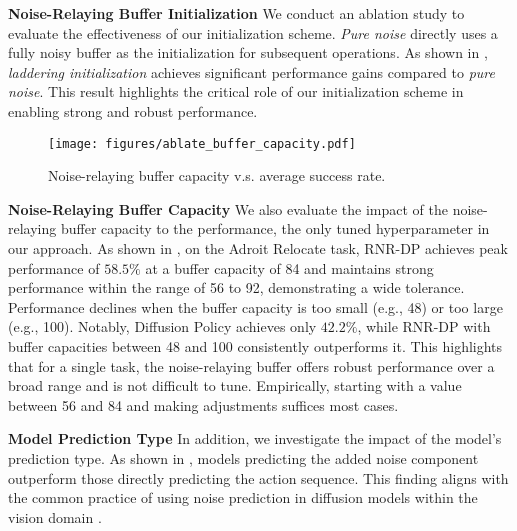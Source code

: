 


\textbf{Noise-Relaying Buffer Initialization}
We conduct an ablation study to evaluate the effectiveness of our initialization scheme. \emph{Pure noise} directly uses a fully noisy buffer as the initialization for subsequent operations. As shown in , \emph{laddering initialization} achieves significant performance gains compared to \emph{pure noise}. This result highlights the critical role of our initialization scheme in enabling strong and robust performance.



\begin{wrapfigure}{r}{0.34\textwidth}
    \centering
    \vspace{-\baselineskip}
    \texttt{[image: figures/ablate\_buffer\_capacity.pdf]}
    \vspace{-13pt}
    \caption{Noise-relaying buffer capacity v.s. average success rate.}
    \label{fig:ablate_buffer_capacity}
\end{wrapfigure}
\textbf{Noise-Relaying Buffer Capacity}
We also evaluate the impact of the noise-relaying buffer capacity to the performance, the only tuned hyperparameter in our approach. As shown in , on the Adroit Relocate task, RNR-DP achieves peak performance of \(58.5\%\) at a buffer capacity of 84 and maintains strong performance within the range of 56 to 92, demonstrating a wide tolerance. Performance declines when the buffer capacity is too small (e.g., 48) or too large (e.g., 100). Notably, Diffusion Policy achieves only \(42.2\%\), while RNR-DP with buffer capacities between 48 and 100 consistently outperforms it. This highlights that for a single task, the noise-relaying buffer offers robust performance over a broad range and is not difficult to tune. Empirically, starting with a value between 56 and 84 and making adjustments suffices most cases.


\vspace{1em}
\textbf{Model Prediction Type}
In addition, we investigate the impact of the model's prediction type. As shown in , models predicting the added noise component outperform those directly predicting the action sequence. This finding aligns with the common practice of using noise prediction in diffusion models within the vision domain \citep{ho2020denoising}.


